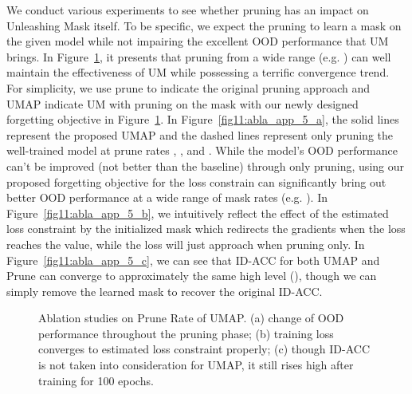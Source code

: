 \documentclass{article}
\theoremstyle{plain}
\theoremstyle{definition}
\theoremstyle{remark}
\begin{document}
We conduct various experiments to see whether pruning has an impact on Unleashing Mask itself. To be specific, we expect the pruning to learn a mask on the given model while not impairing the excellent OOD performance that UM brings. In Figure~\ref{fig11:abla_app_5}, it presents that pruning from a wide range (e.g. ) can well maintain the effectiveness of UM while possessing a terrific convergence trend. For simplicity, we use prune to indicate the original pruning approach and UMAP indicate UM with pruning on the mask with our newly designed forgetting objective in Figure~\ref{fig11:abla_app_5}. In Figure~\ref{fig11:abla_app_5_a}, the solid lines represent the proposed UMAP and the dashed lines represent only pruning the well-trained model at prune rates , , and . While the model's OOD performance can't be improved (not better than the baseline) through only pruning, using our proposed forgetting objective for the loss constrain can significantly bring out better OOD performance at a wide range of mask rates (e.g. ). In Figure~\ref{fig11:abla_app_5_b}, we intuitively reflect the effect of the estimated loss constraint by the initialized mask which redirects the gradients when the loss reaches the value, while the loss will just approach  when pruning only. In Figure~\ref{fig11:abla_app_5_c}, we can see that ID-ACC for both UMAP and Prune can converge to approximately the same high level (), though we can simply remove the learned mask to recover the original ID-ACC.

\begin{figure}[t!]
    \begin{center}
    \end{center}
    \caption{Ablation studies on Prune Rate of UMAP. (a) change of OOD performance throughout the pruning phase; (b) training loss converges to estimated loss constraint properly; (c) though ID-ACC is not taken into consideration for UMAP, it still rises high after training for 100 epochs.}
    \label{fig11:abla_app_5}
\end{figure}
\end{document}
